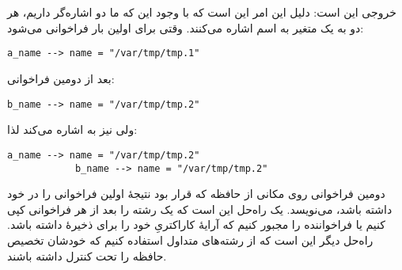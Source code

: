 \section{}
\paragraph{}\label{answer:64}
خروجی این است:
\LTR\noindent
{}
\RTL
دلیل این امر این است که با وجود این که ما دو اشاره‌گر داریم، هر دو به یک متغیر به اسم  اشاره می‌کنند. وقتی  برای اولین بار فراخوانی می‌شود:
\begin{LTR}
        \begin{lstlisting}[style=C++Style]
            a_name --> name = "/var/tmp/tmp.1"
        \end{lstlisting}
\end{LTR}

بعد از دومین فراخوانی:
\begin{LTR}
        \begin{lstlisting}[style=C++Style]
            b_name --> name = "/var/tmp/tmp.2"
        \end{lstlisting}
\end{LTR}

ولی  نیز به  اشاره می‌کند لذا:
\begin{LTR}
        \begin{lstlisting}[style=C++Style]
            a_name --> name = "/var/tmp/tmp.2"
            b_name --> name = "/var/tmp/tmp.2"
        \end{lstlisting}
\end{LTR}

دومین فراخوانی روی مکانی از حافظه که قرار بود نتیجهٔ اولین فراخوانی را در خود داشته باشد، می‌نویسد. یک راه‌حل این است که یک رشته را بعد از هر فراخوانی کپی کنیم یا فراخواننده را مجبور کنیم که آرایهٔ کاراکتریِ خود را برای ذخیرهٔ  داشته باشد. راه‌حل دیگر این است که از رشته‌های متداول  استفاده کنیم که خودشان تخصیص حافظه را تحت کنترل داشته باشند.